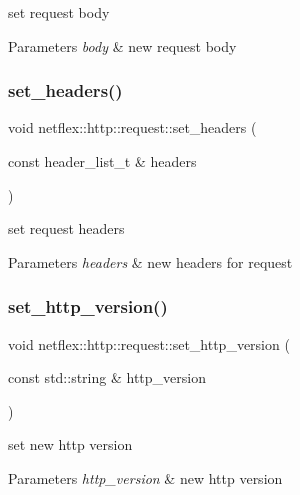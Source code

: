 set request body


\begin{DoxyParams}{Parameters}
{\em body} & new request body \\
\hline
\end{DoxyParams}
\mbox{\label{classnetflex_1_1http_1_1request_aacda09c64841cb272c08262b6bae68a8}} 
\subsubsection{\texorpdfstring{set\+\_\+headers()}{set\_headers()}}
{\footnotesize\ttfamily void netflex\+::http\+::request\+::set\+\_\+headers (\begin{DoxyParamCaption}\item[{const header\+\_\+list\+\_\+t \&}]{headers }\end{DoxyParamCaption})}

set request headers


\begin{DoxyParams}{Parameters}
{\em headers} & new headers for request \\
\hline
\end{DoxyParams}
\mbox{\label{classnetflex_1_1http_1_1request_ab2c0c3caea31016028defd3b76035bd3}} 
\subsubsection{\texorpdfstring{set\+\_\+http\+\_\+version()}{set\_http\_version()}}
{\footnotesize\ttfamily void netflex\+::http\+::request\+::set\+\_\+http\+\_\+version (\begin{DoxyParamCaption}\item[{const std\+::string \&}]{http\+\_\+version }\end{DoxyParamCaption})}

set new http version


\begin{DoxyParams}{Parameters}
{\em http\+\_\+version} & new http version \\
\hline
\end{DoxyParams}
\mbox{\label{classnetflex_1_1http_1_1request_a7210ff25735da523403171152ff653d4}} 

